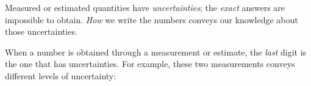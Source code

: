 %
%
%
%
Measured or estimated quantities have \emph{uncertainties}; the \emph{exact}
answers are impossible to obtain. \emph{How} we write the numbers conveys our
knowledge about those uncertainties.

When a number is obtained through a measurement or estimate, the \emph{last}
digit is the one that has uncertainties. For example, these two measurements
conveys different levels of uncertainty:
%

%
%
%

%
%
%

